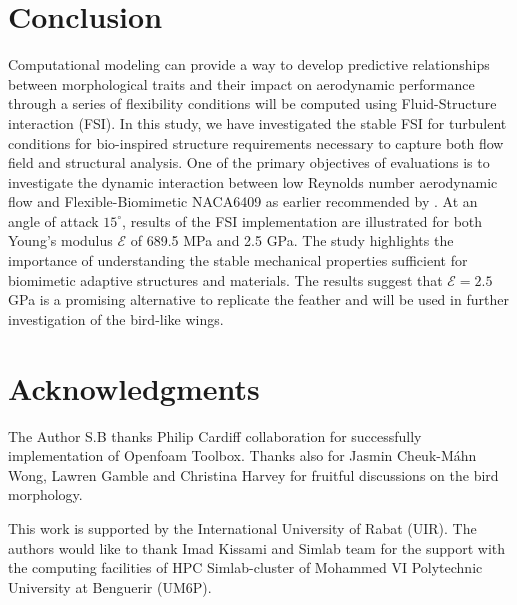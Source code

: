 \section{Conclusion}
Computational modeling can provide a way to develop predictive relationships between morphological traits and their impact on aerodynamic performance through a series of flexibility conditions will be computed using Fluid-Structure interaction (FSI).
%
In this study, we have investigated the stable FSI for turbulent conditions for bio-inspired structure requirements necessary to capture both flow field and structural analysis.
%
One of the primary objectives of evaluations is to investigate the dynamic interaction between low Reynolds number aerodynamic flow and Flexible-Biomimetic NACA6409 as earlier recommended by \citet{gamble2020b}.
%
At an angle of attack $15^{\circ}$, results of the FSI implementation are illustrated for both Young's modulus $\mathcal{E}$ of 689.5 MPa and 2.5 GPa.
%
The study highlights the importance of understanding the stable mechanical properties sufficient for biomimetic adaptive structures and materials.
%
The results suggest that $\mathcal{E}=2.5$ GPa is a promising alternative to replicate the feather and will be used in further investigation of the bird-like wings. 
\section*{Acknowledgments}
The Author S.B thanks Philip Cardiff collaboration for successfully implementation of Openfoam Toolbox.
%
Thanks also for Jasmin Cheuk-Máhn Wong, Lawren Gamble and Christina Harvey for fruitful discussions on the bird morphology.

This work is supported by the International University of Rabat (UIR). 
%
The authors would like to thank Imad Kissami and Simlab team for the support with the computing facilities of HPC Simlab-cluster of Mohammed VI Polytechnic University at Benguerir (UM6P).
